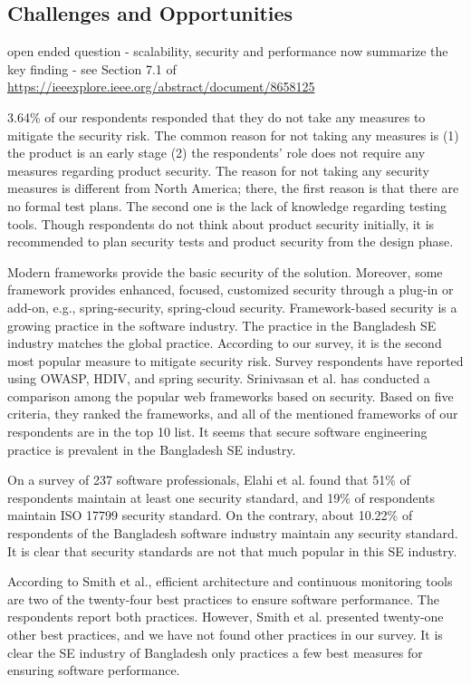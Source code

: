 \subsection{Challenges and Opportunities}
\label{dicussion challanges}
open ended question - scalability, security and performance
now summarize the key finding - see Section 7.1 of \url{https://ieeexplore.ieee.org/abstract/document/8658125}


3.64\% of our respondents responded that they do not take any measures to mitigate the security risk. The common reason for not taking any measures is (1) the product is an early stage (2) the respondents' role does not require any measures regarding product security. The reason for not taking any security measures is different from North America\cite{Assal2019}; there, the first reason is that there are no formal test plans. The second one is the lack of knowledge regarding testing tools. Though respondents do not think about product security initially, it is recommended\cite{Chandra2009,Azham2011} to plan security tests and product security from the design phase.

Modern frameworks provide the basic security of the solution. Moreover, some framework provides enhanced, focused, customized security through a plug-in or add-on, e.g., spring-security, spring-cloud security. Framework-based security is a growing practice in the software industry\cite{Alssir2012}.  The practice in the Bangladesh SE industry matches the global practice. According to our survey, it is the second most popular measure to mitigate security risk. Survey respondents have reported using OWASP, HDIV, and spring security. Srinivasan et al.\cite{Srinivasan2017} has conducted a comparison among the popular web frameworks based on security. Based on five criteria, they ranked the frameworks, and all of the mentioned frameworks of our respondents are in the top 10 list. It seems that secure software engineering practice is prevalent in the Bangladesh SE industry.


On a survey of 237 software professionals, Elahi et al.\cite{Elahi2011} found that 51\% of respondents maintain at least one security standard, and 19\% of respondents maintain ISO 17799 security standard. On the contrary, about 10.22\% of respondents of the Bangladesh software industry maintain any security standard. It is clear that security standards are not that much popular in this SE industry.

According to Smith et al.\cite{Smith2003}, efficient architecture and continuous monitoring tools are two of the twenty-four best practices to ensure software performance.  The respondents report both practices. However, Smith et al. presented twenty-one other best practices, and we have not found other practices in our survey. It is clear the SE industry of Bangladesh only practices a few best measures for ensuring software performance.

